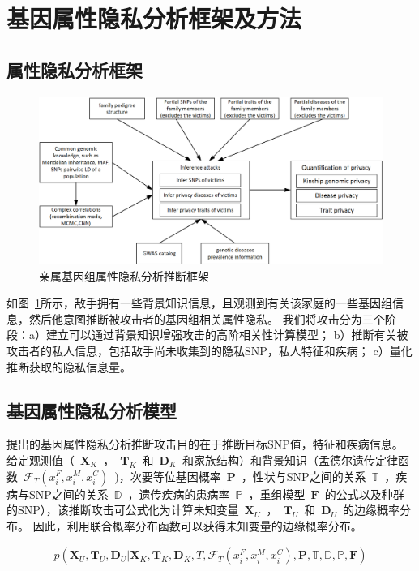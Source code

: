\section{基因属性隐私分析框架及方法}
\label{sec:inference-attack}

\subsection{属性隐私分析框架}

\begin{figure}[htbp]
	\centering
	\includegraphics[width=0.95\linewidth]{./figures/attack-framework.png}
	\centering
	\caption{亲属基因组属性隐私分析推断框架}\label{fig:attack-framework}
\end{figure}

如图~\ref{fig:attack-framework}所示，敌手拥有一些背景知识信息，且观测到有关该家庭的一些基因组信息，然后他意图推断被攻击者的基因组相关属性隐私。 我们将攻击分为三个阶段：a）建立可以通过背景知识增强攻击的高阶相关性计算模型； b）推断有关被攻击者的私人信息，包括敌手尚未收集到的隐私SNP，私人特征和疾病； c）量化推断获取的隐私信息量。

\subsection{基因属性隐私分析模型}
提出的基因属性隐私分析推断攻击目的在于推断目标SNP值，特征和疾病信息。
给定观测值（~$\mathbf{X}_K$~，~$\mathbf{T}_K$~和~$\mathbf{D}_K$~和家族结构）和背景知识（孟德尔遗传定律函数~$\mathcal{F}_T(x_i^F,x_i^M,x_i^C)$~)，次要等位基因概率~$\mathbf{P}$~，性状与SNP之间的关系~$\mathbb{T}$~，疾病与SNP之间的关系~$\mathbb{D}$~，遗传疾病的患病率~$\mathbb{P}$~，重组模型~$\mathbf{F}$~的公式以及种群的SNP），该推断攻击可公式化为计算未知变量~$\mathbf{X}_U$~，~$\mathbf{T}_U$~和~$\mathbf{D}_U$~的边缘概率分布。
因此，利用联合概率分布函数可以获得未知变量的边缘概率分布。

\begin{equation}\label{eq:joint-pro}
\begin{aligned}
p(\mathbf{X}_U, \mathbf{T}_U, \mathbf{D}_U | \mathbf{X}_K, \mathbf{T}_K, \mathbf{D}_K, T, \mathcal{F}_T(x_i^F,x_i^M,x_i^C), \mathbf{P}, \mathbb{T}, \mathbb{D}, \mathbb{P}, \mathbf{F})
\end{aligned}
\end{equation}

